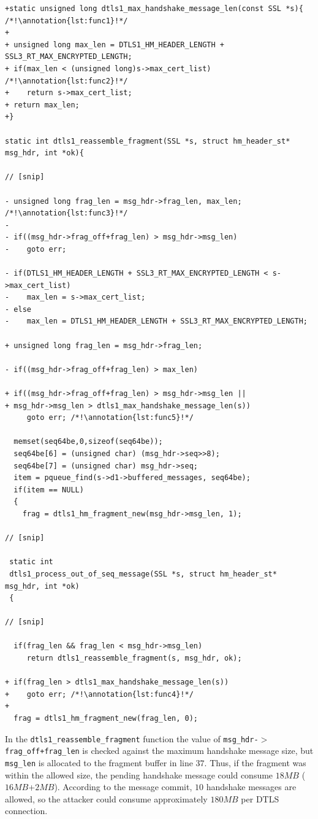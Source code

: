 \documentclass[10pt,conference]{IEEEtran}
\newcounter{lstannotation}
\renewcommand{\thelstannotation}{\ding{\number\numexpr181+\arabic{lstannotation}}}
\newcommand{\annotation}[1]{\refstepcounter{lstannotation}\label{#1}\thelstannotation}
\newcommand{\Sof}[1]{\textbf{[Sofia:[}{\color{red} #1}\textbf{]]}}
\begin{document}
\setcounter{lstannotation}{0}
\begin{lstlisting}[caption={Fix provided by OpenSSL developers to the CVE-2014-3506 vulnerability \Sof{@todo: Fix the regex issue}},label={lst:vuln}]
+static unsigned long dtls1_max_handshake_message_len(const SSL *s){ /*!\annotation{lst:func1}!*/
+
+ unsigned long max_len = DTLS1_HM_HEADER_LENGTH + SSL3_RT_MAX_ENCRYPTED_LENGTH;
+ if(max_len < (unsigned long)s->max_cert_list) /*!\annotation{lst:func2}!*/
+    return s->max_cert_list;
+ return max_len;
+}

static int dtls1_reassemble_fragment(SSL *s, struct hm_header_st* msg_hdr, int *ok){

// [snip]

- unsigned long frag_len = msg_hdr->frag_len, max_len; /*!\annotation{lst:func3}!*/
-
- if((msg_hdr->frag_off+frag_len) > msg_hdr->msg_len)
-    goto err;

- if(DTLS1_HM_HEADER_LENGTH + SSL3_RT_MAX_ENCRYPTED_LENGTH < s->max_cert_list)
-    max_len = s->max_cert_list;
- else
-    max_len = DTLS1_HM_HEADER_LENGTH + SSL3_RT_MAX_ENCRYPTED_LENGTH;

+ unsigned long frag_len = msg_hdr->frag_len;

- if((msg_hdr->frag_off+frag_len) > max_len)

+ if((msg_hdr->frag_off+frag_len) > msg_hdr->msg_len ||
+ msg_hdr->msg_len > dtls1_max_handshake_message_len(s))
     goto err; /*!\annotation{lst:func5}!*/

  memset(seq64be,0,sizeof(seq64be));
  seq64be[6] = (unsigned char) (msg_hdr->seq>>8);
  seq64be[7] = (unsigned char) msg_hdr->seq;
  item = pqueue_find(s->d1->buffered_messages, seq64be);
  if(item == NULL)
  {
    frag = dtls1_hm_fragment_new(msg_hdr->msg_len, 1);

// [snip]

 static int
 dtls1_process_out_of_seq_message(SSL *s, struct hm_header_st* msg_hdr, int *ok)
 {

// [snip]

  if(frag_len && frag_len < msg_hdr->msg_len)
     return dtls1_reassemble_fragment(s, msg_hdr, ok);

+ if(frag_len > dtls1_max_handshake_message_len(s))
+    goto err; /*!\annotation{lst:func4}!*/
+
  frag = dtls1_hm_fragment_new(frag_len, 0);

\end{lstlisting}

In the \texttt{dtls1\_reassemble\_fragment} function the value of
\texttt{msg\_hdr-$>$frag\_off+frag\_len} is checked against the maximum
handshake message size, but \texttt{msg\_len} is allocated to the fragment
buffer in line $37$. Thus, if the fragment was within the allowed size, the
pending handshake message could consume $18MB$ ($16MB$+$2MB$). According to the
message commit, $10$ handshake messages are allowed, so the attacker could
consume approximately $180MB$ per DTLS connection.
\end{document}
